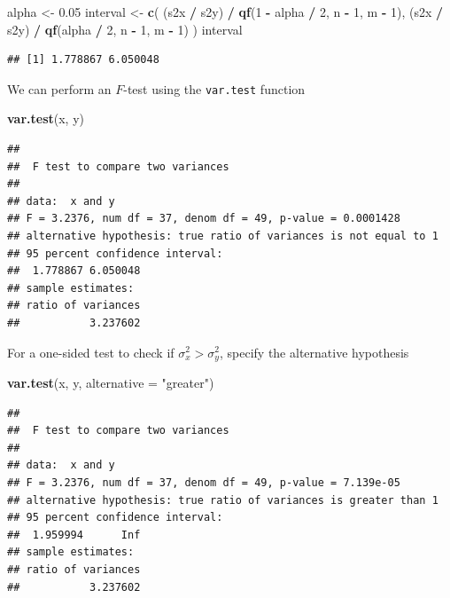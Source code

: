 \documentclass[
]{article}
\newenvironment{Shaded}{\begin{snugshade}}{\end{snugshade}}
\newcommand{\AttributeTok}[1]{\textcolor[rgb]{0.13,0.29,0.53}{#1}}
\newcommand{\DecValTok}[1]{\textcolor[rgb]{0.00,0.00,0.81}{#1}}
\newcommand{\FloatTok}[1]{\textcolor[rgb]{0.00,0.00,0.81}{#1}}
\newcommand{\FunctionTok}[1]{\textcolor[rgb]{0.13,0.29,0.53}{\textbf{#1}}}
\newcommand{\NormalTok}[1]{#1}
\newcommand{\OtherTok}[1]{\textcolor[rgb]{0.56,0.35,0.01}{#1}}
\newcommand{\SpecialCharTok}[1]{\textcolor[rgb]{0.81,0.36,0.00}{\textbf{#1}}}
\newcommand{\StringTok}[1]{\textcolor[rgb]{0.31,0.60,0.02}{#1}}
\begin{document}
\begin{Shaded}
\begin{Highlighting}[]
\NormalTok{alpha }\OtherTok{\textless{}{-}} \FloatTok{0.05}
\NormalTok{interval }\OtherTok{\textless{}{-}} \FunctionTok{c}\NormalTok{(}
\NormalTok{  (s2x }\SpecialCharTok{/}\NormalTok{ s2y) }\SpecialCharTok{/} \FunctionTok{qf}\NormalTok{(}\DecValTok{1} \SpecialCharTok{{-}}\NormalTok{ alpha }\SpecialCharTok{/} \DecValTok{2}\NormalTok{, n }\SpecialCharTok{{-}} \DecValTok{1}\NormalTok{, m }\SpecialCharTok{{-}} \DecValTok{1}\NormalTok{),}
\NormalTok{  (s2x }\SpecialCharTok{/}\NormalTok{ s2y) }\SpecialCharTok{/} \FunctionTok{qf}\NormalTok{(alpha }\SpecialCharTok{/} \DecValTok{2}\NormalTok{, n }\SpecialCharTok{{-}} \DecValTok{1}\NormalTok{, m }\SpecialCharTok{{-}} \DecValTok{1}\NormalTok{)}
\NormalTok{)}
\NormalTok{interval}
\end{Highlighting}
\end{Shaded}

\begin{verbatim}
## [1] 1.778867 6.050048
\end{verbatim}

We can perform an \(F\)-test using the \texttt{var.test} function

\begin{Shaded}
\begin{Highlighting}[]
\FunctionTok{var.test}\NormalTok{(x, y)}
\end{Highlighting}
\end{Shaded}

\begin{verbatim}
## 
##  F test to compare two variances
## 
## data:  x and y
## F = 3.2376, num df = 37, denom df = 49, p-value = 0.0001428
## alternative hypothesis: true ratio of variances is not equal to 1
## 95 percent confidence interval:
##  1.778867 6.050048
## sample estimates:
## ratio of variances 
##           3.237602
\end{verbatim}

For a one-sided test to check if \(\sigma_x^2 > \sigma_y^2\), specify
the alternative hypothesis

\begin{Shaded}
\begin{Highlighting}[]
\FunctionTok{var.test}\NormalTok{(x, y, }\AttributeTok{alternative =} \StringTok{"greater"}\NormalTok{)}
\end{Highlighting}
\end{Shaded}

\begin{verbatim}
## 
##  F test to compare two variances
## 
## data:  x and y
## F = 3.2376, num df = 37, denom df = 49, p-value = 7.139e-05
## alternative hypothesis: true ratio of variances is greater than 1
## 95 percent confidence interval:
##  1.959994      Inf
## sample estimates:
## ratio of variances 
##           3.237602
\end{verbatim}
\end{document}
